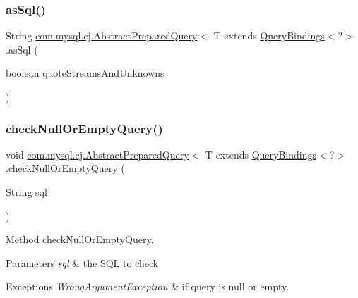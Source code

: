 \subsubsection{\texorpdfstring{as\+Sql()}{asSql()}\hspace{0.1cm}{\footnotesize\ttfamily [2/2]}}
{\footnotesize\ttfamily String \mbox{\hyperlink{classcom_1_1mysql_1_1cj_1_1_abstract_prepared_query}{com.\+mysql.\+cj.\+Abstract\+Prepared\+Query}}$<$ T extends \mbox{\hyperlink{interfacecom_1_1mysql_1_1cj_1_1_query_bindings}{Query\+Bindings}}$<$?$>$.as\+Sql (\begin{DoxyParamCaption}\item[{boolean}]{quote\+Streams\+And\+Unknowns }\end{DoxyParamCaption})}

\mbox{\label{classcom_1_1mysql_1_1cj_1_1_abstract_prepared_query_a8f315309011b4b60fc8edc517a5da730}} 
\subsubsection{\texorpdfstring{check\+Null\+Or\+Empty\+Query()}{checkNullOrEmptyQuery()}}
{\footnotesize\ttfamily void \mbox{\hyperlink{classcom_1_1mysql_1_1cj_1_1_abstract_prepared_query}{com.\+mysql.\+cj.\+Abstract\+Prepared\+Query}}$<$ T extends \mbox{\hyperlink{interfacecom_1_1mysql_1_1cj_1_1_query_bindings}{Query\+Bindings}}$<$?$>$.check\+Null\+Or\+Empty\+Query (\begin{DoxyParamCaption}\item[{String}]{sql }\end{DoxyParamCaption})}

Method check\+Null\+Or\+Empty\+Query.


\begin{DoxyParams}{Parameters}
{\em sql} & the S\+QL to check\\
\hline
\end{DoxyParams}

\begin{DoxyExceptions}{Exceptions}
{\em Wrong\+Argument\+Exception} & if query is null or empty. \\
\hline
\end{DoxyExceptions}
\mbox{\label{classcom_1_1mysql_1_1cj_1_1_abstract_prepared_query_a6bce42566c99020f4a260d78ffcc614f}} 
